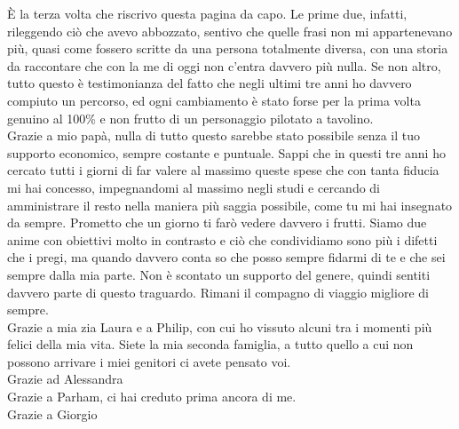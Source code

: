\newpage

\newpage

\begin{itshape}
\noindent È la terza volta che riscrivo questa pagina da capo. Le prime due, infatti, rileggendo ciò che avevo abbozzato, sentivo che quelle frasi non mi appartenevano più, quasi come fossero scritte da una persona totalmente diversa, con una storia da raccontare che con la me di oggi non c’entra davvero più nulla. Se non altro, tutto questo è testimonianza del fatto che negli ultimi tre anni ho davvero compiuto un percorso, ed ogni cambiamento è stato forse per la prima volta genuino al 100\% e non frutto di un personaggio pilotato a tavolino. \\



\noindent Grazie a mio papà, nulla di tutto questo sarebbe stato possibile senza il tuo supporto economico, sempre costante e puntuale. Sappi che in questi tre anni ho cercato tutti i giorni di far valere al massimo queste spese che con tanta fiducia mi hai concesso, impegnandomi al massimo negli studi e cercando di amministrare il resto nella maniera più saggia possibile, come tu mi hai insegnato da sempre. Prometto che un giorno ti farò vedere davvero i frutti. Siamo due anime con obiettivi molto in contrasto e ciò che condividiamo sono più i difetti che i pregi, ma quando davvero conta so che posso sempre fidarmi di te e che sei sempre dalla mia parte. Non è scontato un supporto del genere, quindi sentiti davvero parte di questo traguardo. Rimani il compagno di viaggio migliore di sempre. \\

\noindent Grazie a mia zia Laura e a Philip, con cui ho vissuto alcuni tra i momenti più felici della mia vita. Siete la mia seconda famiglia, a tutto quello a cui non possono arrivare i miei genitori ci avete pensato voi. \\

\noindent Grazie ad Alessandra \\ 

\noindent Grazie a Parham, ci hai creduto prima ancora di me. \\

\noindent Grazie a Giorgio \\


\end{itshape}

